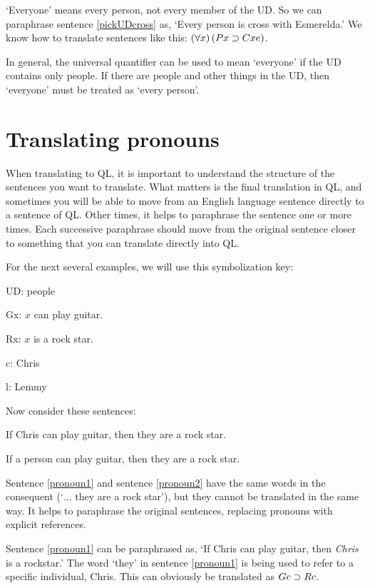 `Everyone' means every person, not every member of the UD. So we can paraphrase sentence \ref{pickUDcross} as, `Every person is cross with Esmerelda.' We know how to translate sentences like this: $(\forall x) \,(Px \supset Cxe)$.

In general, the universal quantifier can be used to mean `everyone' if the UD contains only people. If there are people and other things in the UD, then `everyone' must be treated as `every person'.





\section{Translating pronouns}
When translating to QL, it is important to understand the structure of the sentences you want to translate. What matters is the final translation in QL, and sometimes you will be able to move from an English language sentence directly to a sentence of QL. Other times, it helps to paraphrase the sentence one or more times. Each successive paraphrase should move from the original sentence closer to something that you can translate directly into QL.

For the next several examples, we will use this symbolization key:

\begin{ekey}
\item[UD:] people
\item[Gx:] $x$ can play guitar.
\item[Rx:] $x$ is a rock star.
\item[c:] Chris
\item[l:] Lemmy
\end{ekey}

Now consider these sentences:

\begin{earg}
\item[\ex{pronoun1}] If Chris can play guitar, then they are a rock star.
\item[\ex{pronoun2}] If a person can play guitar, then they are a rock star.
\end{earg}

Sentence \ref{pronoun1} and sentence \ref{pronoun2} have the same words in the consequent (`$\ldots$ they are a rock star'), but they cannot be translated in the same way. It helps to paraphrase the original sentences, replacing pronouns with explicit references.

Sentence \ref{pronoun1} can be paraphrased as, `If Chris can play guitar, then \emph{Chris} is a rockstar.' The word `they' in sentence \ref{pronoun1} is being used to refer to a specific individual, Chris. This can obviously be translated as $Gc \supset Rc$.

